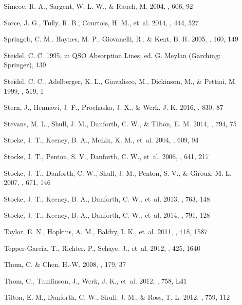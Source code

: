 \documentclass[twocolumn,twocolappendix,tighten,times]{aastex6}
\begin{document}
\begin{thebibliography}
 Simcoe, R. A., Sargent, W. L. W., \& Rauch, M. 2004, \apj, 606, 92

 Sorce, J. G., Tully, R. B., Courtois, H. M., et~al. 2014, \mnras, 444, 527

 Springob, C. M., Haynes, M. P., Giovanelli, R., \& Kent, B. R. 2005, \apjs, 160, 149

 Steidel, C. C. 1995, in QSO Absorption Lines, ed. G. Meylan (Garching: Springer), 139

 Steidel, C. C., Adelberger, K. L., Giavalisco, M., Dickinson, M., \& Pettini, M. 1999, \apj, 519, 1

 Stern, J., Hennawi, J. F., Prochaska, J. X., \& Werk, J. K. 2016, \apj, 830, 87

 Stevans, M. L., Shull, J. M., Danforth, C. W., \& Tilton, E. M. 2014, \apj, 794, 75

 Stocke, J. T., Keeney, B. A., McLin, K. M., et~al. 2004, \apj, 609, 94

 Stocke, J. T., Penton, S. V., Danforth, C. W., et~al. 2006, \apj, 641, 217

 Stocke, J. T., Danforth, C. W., Shull, J. M., Penton, S. V., \& Giroux, M. L. 2007, \apj, 671, 146

 Stocke, J. T., Keeney, B. A., Danforth, C. W., et~al. 2013, \apj, 763, 148

 Stocke, J. T., Keeney, B. A., Danforth, C. W., et~al. 2014, \apj, 791, 128

 Taylor, E. N., Hopkins, A. M., Baldry, I. K., et~al. 2011, \mnras, 418, 1587

 Tepper-Garcia, T., Richter, P., Schaye, J., et~al. 2012, \mnras, 425, 1640

 Thom, C. \& Chen, H.-W. 2008, \apjs, 179, 37

 Thom, C., Tumlinson, J., Werk, J. K., et~al. 2012, \apj, 758, L41

 Tilton, E. M., Danforth, C. W., Shull, J. M., \& Ross, T. L. 2012, \apj, 759, 112


\end{thebibliography}
\end{document}
